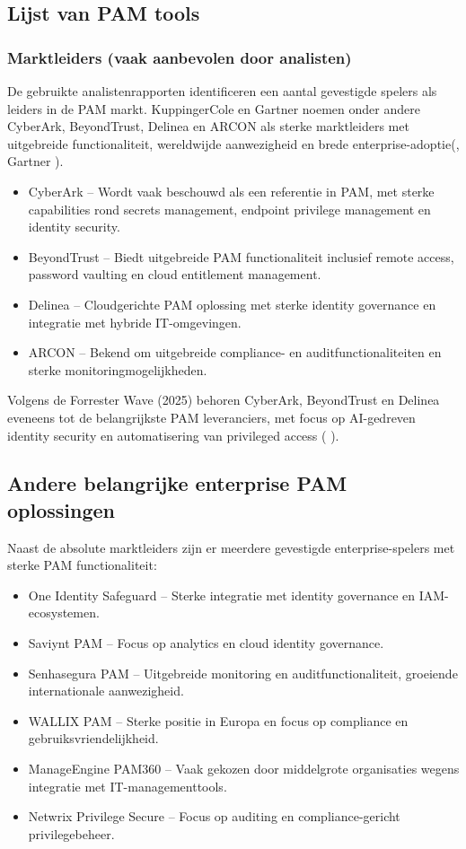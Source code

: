 \subsection{Lijst van PAM tools}
\subsubsection{Marktleiders (vaak aanbevolen door analisten)}

De gebruikte analistenrapporten identificeren een aantal gevestigde spelers als leiders in de PAM markt. KuppingerCole en Gartner noemen onder andere CyberArk, BeyondTrust, Delinea en ARCON als sterke marktleiders met uitgebreide functionaliteit, wereldwijde aanwezigheid en brede enterprise-adoptie(\cite{KuppingerColePAM2024}, Gartner \cite{GartnerMagicQuadrantPAM2025}).
\begin{itemize}
	\item CyberArk – Wordt vaak beschouwd als een referentie in PAM, met sterke capabilities rond secrets management, endpoint privilege management en identity security. 
	\item BeyondTrust – Biedt uitgebreide PAM functionaliteit inclusief remote access, password vaulting en cloud entitlement management. 
	\item Delinea – Cloudgerichte PAM oplossing met sterke identity governance en integratie met hybride IT-omgevingen. 
	\item ARCON – Bekend om uitgebreide compliance- en auditfunctionaliteiten en sterke monitoringmogelijkheden. 
\end{itemize}

Volgens de Forrester Wave (2025) behoren CyberArk, BeyondTrust en Delinea eveneens tot de belangrijkste PAM leveranciers, met focus op AI-gedreven identity security en automatisering van privileged access ( \cite{ForresterWavePIM2025}).

\subsection{Andere belangrijke enterprise PAM oplossingen}
Naast de absolute marktleiders zijn er meerdere gevestigde enterprise-spelers met sterke PAM functionaliteit:

\begin{itemize}
	\item One Identity Safeguard – Sterke integratie met identity governance en IAM-ecosystemen. 
	\item Saviynt PAM – Focus op analytics en cloud identity governance. 
	\item Senhasegura PAM – Uitgebreide monitoring en auditfunctionaliteit, groeiende internationale aanwezigheid. 
	\item WALLIX PAM – Sterke positie in Europa en focus op compliance en gebruiksvriendelijkheid. 
	\item ManageEngine PAM360 – Vaak gekozen door middelgrote organisaties wegens integratie met IT-managementtools. 
	\item Netwrix Privilege Secure – Focus op auditing en compliance-gericht privilegebeheer. 
\end{itemize}
